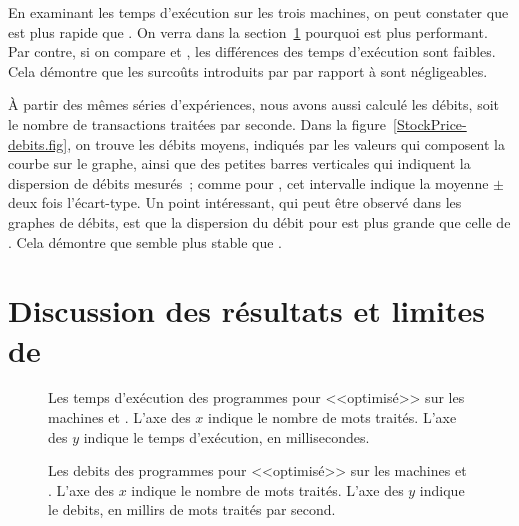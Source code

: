 En examinant les temps d'ex\'ecution sur les trois machines, on peut constater que  est plus rapide que . On verra dans la section~\ref{limitesppff.sect} pourquoi  est plus performant. Par contre, si on compare  et , les diff\'erences des temps d'ex\'ecution sont faibles. Cela d\'emontre que les surco\^uts introduits par  par rapport \`a  sont négligeables.

\`A partir des m\^emes s\'eries d'exp\'eriences, nous avons aussi calcul\'e les d\'ebits, soit le nombre de transactions trait\'ees par seconde. Dans la figure~\ref{StockPrice-debits.fig}, on trouve les d\'ebits moyens, indiqués par les valeurs qui composent la courbe sur le graphe, ainsi que des petites barres verticales qui indiquent la dispersion de débits mesurés~; comme pour , cet intervalle indique la moyenne $\pm$ deux fois l'écart-type. Un point int\'eressant, qui peut \^etre observ\'e dans les graphes de d\'ebits, est que la dispersion du d\'ebit pour  est plus grande que celle de . Cela d\'emontre que  semble plus stable que . 

\section{Discussion des résultats et limites de \ppff}
\label{limitesppff.sect}


\begin{figure}


\caption[Les temps d'exécution des programmes pour 
<<optimisé>> sur les machines  et .]{Les temps d'exécution des
programmes pour  <<optimisé>> sur les machines  et
. L'axe des $x$ indique le nombre de mots traités. L'axe des $y$
indique le temps d'exécution, en millisecondes.}
\label{WordCount-merged-temps.fig}
\end{figure}


\begin{figure}


\caption[Les debits des programmes pour 
<<optimisé>> sur les machines  et .]{Les debits des
programmes pour  <<optimisé>> sur les machines  et
. L'axe des $x$ indique le nombre de mots traités. L'axe des $y$
indique le debits, en millirs de mots traités par second.}
\label{WordCount-merged-debit.fig}
\end{figure}
